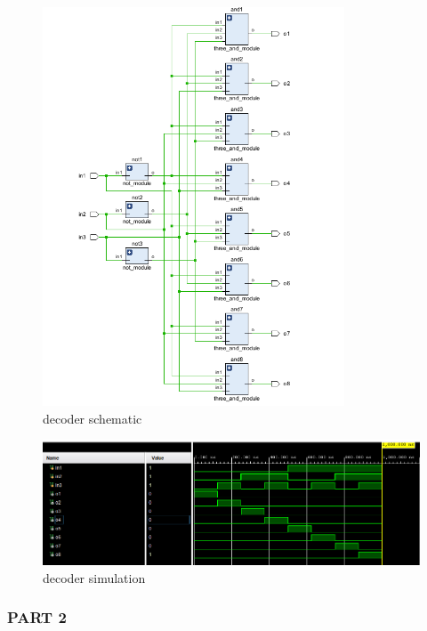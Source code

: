 \documentclass[pdftex,12pt,a4paper]{article}
\begin{document}
    \begin{figure}[H]
    	\centering
    	\includegraphics[width=0.8\textwidth]{schematic/decoder_schematic.png}	
    	\caption{decoder schematic}
    	\label{decoder schematic}
    \end{figure}
    
    \begin{figure}[H]
    	\centering
    	\includegraphics[width=1\textwidth]{simulations/decoder_sim.png}	
    	\caption{decoder simulation}
    	\label{decoder simulation}
    \end{figure}
    
\subsubsection{PART 2}
\end{document}
